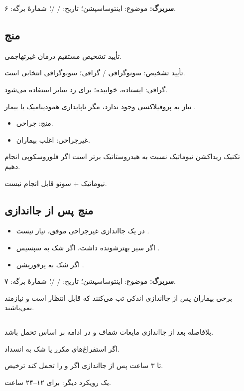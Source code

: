 \documentclass[12pt,a4paper]{article}
\begin{document}
\textbf{سربرگ:} موضوع: اینتوساسپشن؛ تاریخ: / /؛ شمارهٔ برگه: ۶.
\subsection*{منج}
تأیید تشخیص \IntussusceptionArrow مستقیم درمان غیرتهاجمی.

تأیید تشخیص: سونوگرافی / گرافی؛ سونوگرافی انتخابی است.

گرافی: ایستاده، خوابیده؛ برای رد سایر استفاده می‌شود.

نیاز به  پروفیلاکسی وجود ندارد، مگر ناپایداری همودینامیک یا بیمار .
\begin{itemize}
\item منج: جراحی.
\item غیرجراحی: اغلب بیماران.
\end{itemize}
تکنیک ریداکشن نیوماتیک نسبت به هیدروستاتیک برتر است اگر فلوروسکوپی انجام دهیم.

نیوماتیک + سونو قابل انجام نیست.

\subsection*{منج پس از جااندازی}
\begin{itemize}
\item در یک جااندازی غیرجراحی موفق، نیاز نیست \IntussusceptionArrow {}.
\item اگر سیر بهترشونده داشت، اگر شک به سپسیس \IntussusceptionArrow {}.
\item اگر شک به پرفوریشن \IntussusceptionArrow {}.
\end{itemize}

\textbf{سربرگ:} موضوع: اینتوساسپشن؛ تاریخ: / /؛ شمارهٔ برگه: ۷.

برخی بیماران پس از جااندازی اندکی تب می‌کنند که قابل انتظار است و نیازمند  نمی‌باشند.

\subsection*{}
بلافاصله بعد از جااندازی مایعات شفاف و در ادامه بر اساس تحمل  باشد.

 اگر استفراغ‌های مکرر یا شک به انسداد.

تا ۳ ساعت پس از جااندازی اگر  و  را تحمل کند
\IntussusceptionArrow ترخیص.

یک رویکرد دیگر:  برای ۱۲–۲۴ ساعت.
\end{document}
